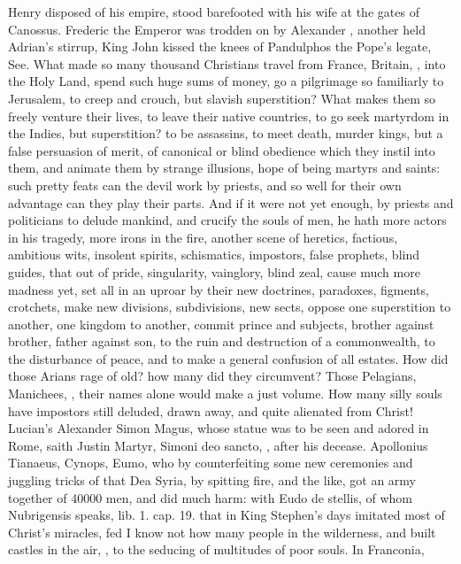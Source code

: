 {Henry  disposed of his empire, stood barefooted with his wife
at the gates of Canossus. Frederic the Emperor was trodden on by
Alexander , another held Adrian's stirrup, King John kissed the
knees of Pandulphos the Pope's legate, See. What made so many thousand
Christians travel from France, Britain, \etc{}, into the Holy Land, spend
such huge sums of money, go a pilgrimage so familiarly to Jerusalem, to
creep and crouch, but slavish superstition? What makes them so freely
venture their lives, to leave their native countries, to go seek
martyrdom in the Indies, but superstition? to be assassins, to meet
death, murder kings, but a false persuasion of merit, of canonical or
blind obedience which they instil into them, and animate them by
strange illusions, hope of being martyrs and saints: such pretty feats
can the devil work by priests, and so well for their own advantage can
they play their parts. And if it were not yet enough, by priests and
politicians to delude mankind, and crucify the souls of men, he hath
more actors in his tragedy, more irons in the fire, another scene of
heretics, factious, ambitious wits, insolent spirits, schismatics,
impostors, false prophets, blind guides, that out of pride,
singularity, vainglory, blind zeal, cause much more madness yet, set
all in an uproar by their new doctrines, paradoxes, figments,
crotchets, make new divisions, subdivisions, new sects, oppose one
superstition to another, one kingdom to another, commit prince and
subjects, brother against brother, father against son, to the ruin and
destruction of a commonwealth, to the disturbance of peace, and to make
a general confusion of all estates. How did those Arians rage of old?
how many did they circumvent? Those Pelagians, Manichees, \etc{}, their
names alone would make a just volume. How many silly souls have
impostors still deluded, drawn away, and quite alienated from Christ!
Lucian's Alexander Simon Magus, whose statue was to be seen and adored
in Rome, saith Justin Martyr, Simoni deo sancto, \etc{}, after his
decease. Apollonius Tianaeus, Cynops, Eumo, who by counterfeiting
some new ceremonies and juggling tricks of that Dea Syria, by spitting
fire, and the like, got an army together of 40\thinspace{}000 men, and did much
harm: with Eudo de stellis, of whom Nubrigensis speaks, lib. 1. cap.
19. that in King Stephen's days imitated most of Christ's miracles, fed
I know not how many people in the wilderness, and built castles in the
air, \etc{}, to the seducing of multitudes of poor souls. In Franconia,
}
